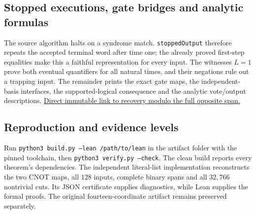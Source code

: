 \subsection{Stopped executions, gate bridges and analytic formulas}
The source algorithm halts on a syndrome match. \texttt{stoppedOutput}
therefore repeats the accepted terminal word after time one; the already
proved first-step equalities make this a faithful representation for every
input. The witnesses $L=1$ prove both eventual quantifiers for all natural
times, and their negations rule out a trapping input. The remainder prints
the exact gate maps, the independent-basis interfaces, the supported-logical
consequence and the analytic vote/output descriptions.
\href{https://github.com/alectionary/vibe-math/blob/65bcfe0d8573a392f250295fcfa3619b586e4159/formalization/gallager-b-absorbing/connected/Connected.lean#L88}{Direct immutable link to recovery modulo the full opposite span.}
\subsection{Reproduction and evidence levels}
Run \texttt{python3 build.py --lean /path/to/lean} in the artifact folder
with the pinned toolchain, then \texttt{python3 verify.py --check}.
The clean build reports every theorem's dependencies. The independent
literal-list implementation reconstructs the two CNOT maps, all $128$
inputs, complete binary spans and all $32,766$ nontrivial cuts. Its JSON
certificate supplies diagnostics, while Lean supplies the formal proofs.
The original fourteen-coordinate artifact remains preserved separately.
